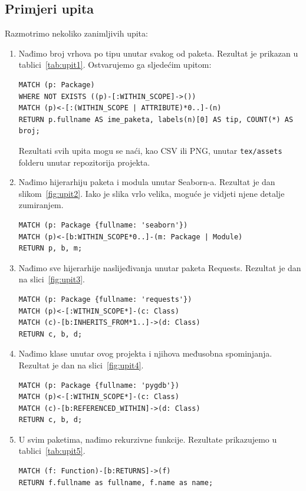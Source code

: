 \subsection{Primjeri upita} \label{subsec:primjer}
Razmotrimo nekoliko zanimljivih upita:
\begin{enumerate}

\item Nađimo broj vrhova po tipu unutar svakog od paketa. Rezultat je prikazan
u tablici~\ref{tab:upit1}. Ostvarujemo ga sljedećim upitom:
\begin{lstlisting}
MATCH (p: Package)
WHERE NOT EXISTS ((p)-[:WITHIN_SCOPE]->())
MATCH (p)<-[:(WITHIN_SCOPE | ATTRIBUTE)*0..]-(n)
RETURN p.fullname AS ime_paketa, labels(n)[0] AS tip, COUNT(*) AS broj;
\end{lstlisting}
Rezultati svih upita mogu se naći, kao CSV ili PNG, unutar \texttt{tex/assets}
folderu unutar repozitorija projekta.

\item Nađimo hijerarhiju paketa i modula unutar Seaborn-a. Rezultat je
dan slikom~\ref{fig:upit2}. Iako je slika vrlo velika,
moguće je vidjeti njene detalje zumiranjem.
\begin{lstlisting}
MATCH (p: Package {fullname: 'seaborn'})
MATCH (p)<-[b:WITHIN_SCOPE*0..]-(m: Package | Module)
RETURN p, b, m;
\end{lstlisting}

\item Nađimo sve hijerarhije naslijeđivanja unutar paketa Requests. Rezultat je dan
na slici~\ref{fig:upit3}.
\begin{lstlisting}
MATCH (p: Package {fullname: 'requests'})
MATCH (p)<-[:WITHIN_SCOPE*]-(c: Class)
MATCH (c)-[b:INHERITS_FROM*1..]->(d: Class)
RETURN c, b, d;
\end{lstlisting}

\item Nađimo klase unutar ovog projekta i njihova međusobna spominjanja. Rezultat
je dan na slici~\ref{fig:upit4}.
\begin{lstlisting}
MATCH (p: Package {fullname: 'pygdb'})
MATCH (p)<-[:WITHIN_SCOPE*]-(c: Class)
MATCH (c)-[b:REFERENCED_WITHIN]->(d: Class)
RETURN c, b, d;
\end{lstlisting}

\item U svim paketima, nađimo rekurzivne funkcije. Rezultate prikazujemo u
tablici~\ref{tab:upit5}.

\begin{lstlisting}
MATCH (f: Function)-[b:RETURNS]->(f)
RETURN f.fullname as fullname, f.name as name;
\end{lstlisting}


\end{enumerate}

